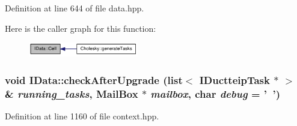 Definition at line 644 of file data.hpp.

Here is the caller graph for this function:\nopagebreak
\begin{figure}[H]
\begin{center}
\leavevmode
\includegraphics[width=136pt]{class_i_data_a01298b83fbbb3a79261c7d11b64ba5d1_icgraph}
\end{center}
\end{figure}
\hypertarget{class_i_data_a24f0723eb905accf62461f50a4487b33}{
\subsubsection[{checkAfterUpgrade}]{\setlength{\rightskip}{0pt plus 5cm}void IData::checkAfterUpgrade (list$<$ {\bf IDuctteipTask} $\ast$ $>$ \& {\em running\_\-tasks}, \/  {\bf MailBox} $\ast$ {\em mailbox}, \/  char {\em debug} = {\ttfamily '~'})}}
\label{class_i_data_a24f0723eb905accf62461f50a4487b33}


Definition at line 1160 of file context.hpp.

